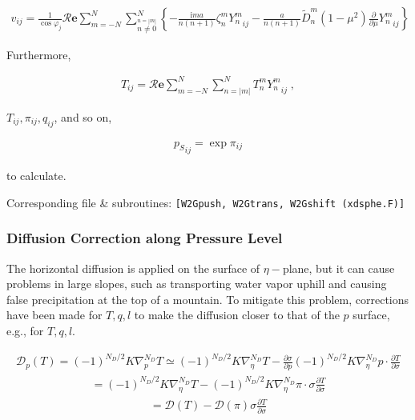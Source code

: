 \begin{eqnarray}
  v_{ij}
  =  \frac{1}{\cos \varphi_j}
     {\mathcal R}{\mathbf{e}} \sum_{m=-N}^{N}
                       \sum_{\stackrel{n=|m|}{n \neq 0}}^{N}
    \left\{
          -  \frac{\mathrm{i}m a}{n(n+1)} \zeta_n^m  {Y_n^m}_{ij}
          -  \frac{a}{n(n+1)} \tilde{D}_n^m
            (1-\mu^{2}) \frac{\partial{}}{\partial {\mu}} {Y_n^m}_{ij}
    \right\}
\end{eqnarray}

Furthermore,

\begin{eqnarray}
  T_{ij}
   =  {\mathcal R}{\mathbf{e}} \sum_{m=-N}^{N} \sum_{n=|m|}^{N}
      T_n^m  {Y_n^m}_{ij} \; ,
\end{eqnarray}

\(T_{ij}, \pi_{ij}, q_{ij}\), and so on,

\begin{eqnarray}
  {p_S}_{ij} = \exp \pi_{ij}
\end{eqnarray}

to calculate.

Corresponding file \& subroutines:
\texttt{{[}W2Gpush,\ W2Gtrans,\ W2Gshift\ (xdsphe.F){]}}

\hypertarget{diffusion-correction-along-pressure-level}{%
\subsubsection{Diffusion Correction along Pressure
Level}\label{diffusion-correction-along-pressure-level}}

The horizontal diffusion is applied on the surface of \(\eta-\)plane,
but it can cause problems in large slopes, such as transporting water
vapor uphill and causing false precipitation at the top of a mountain.
To mitigate this problem, corrections have been made for \(T,q,l\) to
make the diffusion closer to that of the \(p\) surface, e.g., for
\(T,q,l\).

\begin{eqnarray}
  {\mathcal D}_p (T) = (-1)^{N_D/2} K \nabla^{N_D}_p T  
                \simeq  (-1)^{N_D/2} K \nabla^{N_D}_{\eta} T  
                      - \frac{\partial{\sigma}}{\partial {p}}
                      (-1)^{N_D/2} K \nabla^{N_D}_{\eta} p
                      \cdot \frac{\partial{T}}{\partial {\sigma}}
\end{eqnarray} \begin{eqnarray}
                =      (-1)^{N_D/2} K \nabla^{N_D}_{\eta} T  
                    -  (-1)^{N_D/2} K \nabla^{N_D}_{\eta} \pi
                          \cdot \sigma \frac{\partial{T}}{\partial {\sigma}}
\end{eqnarray} \begin{eqnarray}
                =    {\mathcal D} (T)
                    -  {\mathcal D} (\pi)
                       \sigma \frac{\partial{T}}{\partial {\sigma}}
\end{eqnarray}

